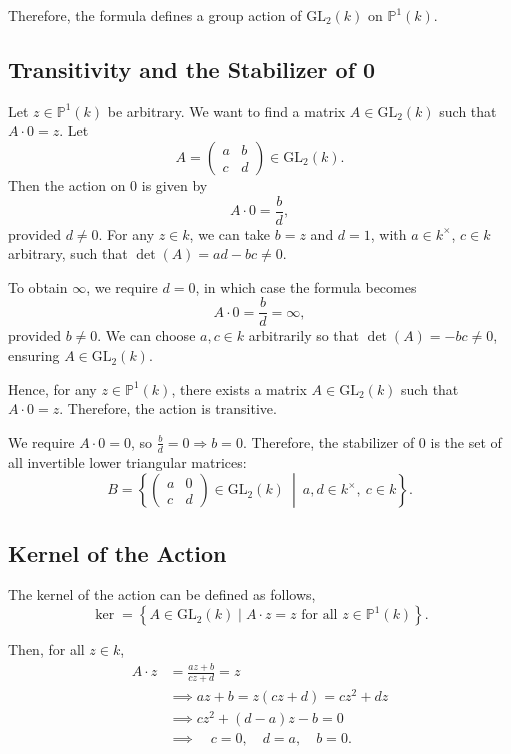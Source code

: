 \documentclass[12pt]{article}
\begin{document}
\medskip

Therefore, the formula defines a group action of \( \mathrm{GL}_2(k) \) on \( \mathbb{P}^1(k) \).

\subsection*{Transitivity and the Stabilizer of 0}

Let \( z \in \mathbb{P}^1(k) \) be arbitrary. We want to find a matrix \( A \in \mathrm{GL}_2(k) \) such that \( A \cdot 0 = z \). Let
\[
A = \begin{pmatrix} a & b \\ c & d \end{pmatrix} \in \mathrm{GL}_2(k).
\]
Then the action on \( 0 \) is given by
\[
A \cdot 0 = \frac{b}{d},
\]
provided \( d \neq 0 \). For any \( z \in k \), we can take \( b = z \) and \( d = 1 \), with \( a \in k^\times \), \( c \in k \) arbitrary, such that \( \det(A) = ad - bc \neq 0 \).

To obtain \( \infty \), we require \( d = 0 \), in which case the formula becomes
\[
A \cdot 0 = \frac{b}{d} = \infty,
\]
provided \( b \neq 0 \). We can choose \( a, c \in k \) arbitrarily so that \( \det(A) = -bc \neq 0 \), ensuring \( A \in \mathrm{GL}_2(k) \).

Hence, for any \( z \in \mathbb{P}^1(k) \), there exists a matrix \( A \in \mathrm{GL}_2(k) \) such that \( A \cdot 0 = z \). Therefore, the action is transitive.

We require \( A \cdot 0 = 0 \), so \( \frac{b}{d} = 0 \Rightarrow b = 0 \). Therefore, the stabilizer of 0 is the set of all invertible lower triangular matrices:
\[
B = \left\{ \begin{pmatrix} a & 0 \\ c & d \end{pmatrix} \in \mathrm{GL}_2(k) \ \middle| \ a, d \in k^\times, \ c \in k \right\}.
\]

\subsection*{Kernel of the Action}

The kernel of the action can be defined as follows,
\[
\ker = \left\{ A \in \mathrm{GL}_2(k) \mid A \cdot z = z \text{ for all } z \in \mathbb{P}^1(k) \right\}.
\]

Then, for all \( z \in k \),
\begin{align*}
A \cdot z &= \frac{az + b}{cz + d} = z \\
&\implies az + b = z(cz + d) = cz^2 + dz \\
&\implies cz^2 + (d - a)z - b = 0 \\
&\implies \quad c = 0, \quad d = a, \quad b = 0.
\end{align*}
\end{document}
